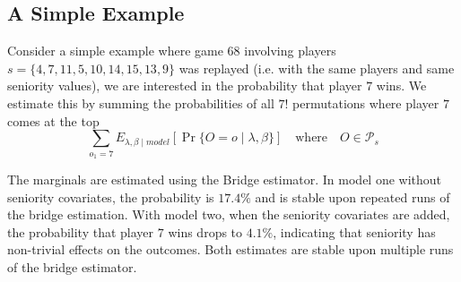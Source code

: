\subsection{A Simple Example}
Consider a simple example where game $68$ involving players $s=\{4, 7, 11, 5, 10, 14, 15, 13, 9\}$ was replayed (i.e. with the same players and same seniority values), we are interested in the probability that player $7$ wins. We estimate this by summing the probabilities of all $7!$ permutations where player $7$ comes at the top
\begin{equation*}
  \sum_{o_{1}=7} E_{\lambda, \beta \mid model} \left[ \operatorname{Pr}\{O=o \mid \lambda, \beta\} \right] \quad \text{where} \quad O \in \mathcal{P}_{s}
\end{equation*}

The marginals are estimated using the Bridge estimator. In model one without seniority covariates, the probability is $17.4\%$ and is stable upon repeated runs of the bridge estimation. With model two, when the seniority covariates are added, the probability that player $7$ wins drops to $4.1\%$, indicating that seniority has non-trivial effects on the outcomes. Both estimates are stable upon multiple runs of the bridge estimator.
